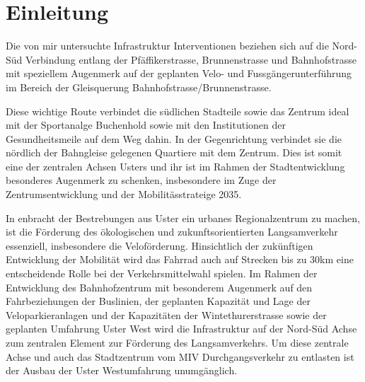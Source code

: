 %
%
%
%

\chapter{Einleitung}
\label{chap:Einleitung}

Die von mir untersuchte Infrastruktur Interventionen beziehen sich auf die Nord-Süd Verbindung
entlang der Pfäffikerstrasse, Brunnenstrasse und Bahnhofstrasse mit speziellem Augenmerk auf der geplanten Velo- und Fussgängerunterführung im Bereich der Gleisquerung Bahnhofstrasse/Brunnenstrasse. 

Diese wichtige Route verbindet die südlichen Stadteile sowie das Zentrum ideal mit der Sportanalge Buchenhold sowie mit den Institutionen der Gesundheitsmeile auf dem Weg dahin. In der Gegenrichtung verbindet sie die nördlich der Bahngleise gelegenen Quartiere mit dem Zentrum. Dies ist somit eine der zentralen Achsen Usters und ihr ist im Rahmen der Stadtentwicklung besonderes Augenmerk zu schenken, insbesondere im Zuge der Zentrumsentwicklung und der Mobilitässtrateige 2035. 

In enbracht der Bestrebungen aus Uster ein urbanes Regionalzentrum zu machen, ist die Förderung des ökologischen und zukunftsorientierten Langsamverkehr essenziell, insbesondere die Veloförderung. Hinsichtlich der zukünftigen Entwicklung der Mobilität wird das Fahrrad auch auf Strecken bis zu 30km eine entscheidende Rolle bei der Verkehrsmittelwahl spielen. 
Im Rahmen der Entwicklung des Bahnhofzentrum mit besonderem Augenmerk auf den Fahrbeziehungen der Buslinien, der geplanten Kapazität und Lage der Veloparkieranlagen und der Kapazitäten der Wintethurerstrasse sowie der geplanten Umfahrung Uster West wird die Infrastruktur auf der Nord-Süd Achse zum zentralen Element zur Förderung des Langsamverkehrs. Um diese zentrale Achse und auch das Stadtzentrum vom MIV Durchgangsverkehr zu entlasten ist der Ausbau der Uster Westumfahrung unumgänglich. 

